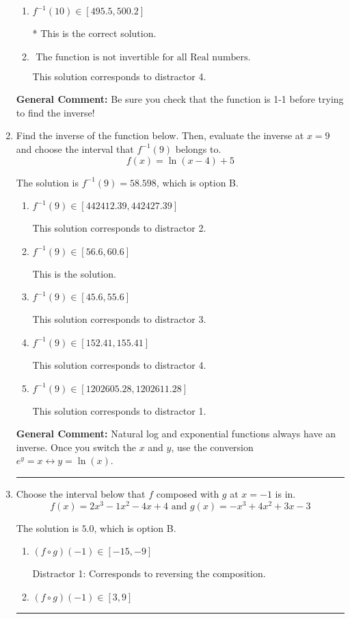 \documentclass{extbook}[14pt]
\newcommand{\litem}[1]{\item #1

\rule{\textwidth}{0.4pt}}
\begin{document}
\begin{enumerate}
{\begin{enumerate}[label=\Alph*.]
 This solution corresponds to distractor 2.
\item \( f^{-1}(10) \in [495.5, 500.2] \)

* This is the correct solution.
\item \( \text{ The function is not invertible for all Real numbers. } \)

 This solution corresponds to distractor 4.
\end{enumerate}

\textbf{General Comment:} Be sure you check that the function is 1-1 before trying to find the inverse!
}
\litem{
Find the inverse of the function below. Then, evaluate the inverse at $x = 9$ and choose the interval that $f^{-1}(9)$ belongs to.
\[ f(x) = \ln{(x-4)}+5 \]

The solution is \( f^{-1}(9) = 58.598 \), which is option B.\begin{enumerate}[label=\Alph*.]
\item \( f^{-1}(9) \in [442412.39, 442427.39] \)

 This solution corresponds to distractor 2.
\item \( f^{-1}(9) \in [56.6, 60.6] \)

 This is the solution.
\item \( f^{-1}(9) \in [45.6, 55.6] \)

 This solution corresponds to distractor 3.
\item \( f^{-1}(9) \in [152.41, 155.41] \)

 This solution corresponds to distractor 4.
\item \( f^{-1}(9) \in [1202605.28, 1202611.28] \)

 This solution corresponds to distractor 1.
\end{enumerate}

\textbf{General Comment:} Natural log and exponential functions always have an inverse. Once you switch the $x$ and $y$, use the conversion $ e^y = x \leftrightarrow y=\ln(x)$.
}
\litem{
Choose the interval below that $f$ composed with $g$ at $x=-1$ is in.
\[ f(x) = 2x^{3} -1 x^{2} -4 x + 4 \text{ and } g(x) = -x^{3} +4 x^{2} +3 x -3 \]

The solution is \( 5.0 \), which is option B.\begin{enumerate}[label=\Alph*.]
\item \( (f \circ g)(-1) \in [-15, -9] \)

 Distractor 1: Corresponds to reversing the composition.
\item \( (f \circ g)(-1) \in [3, 9] \)


\end{enumerate}}
\end{enumerate}
\end{document}
